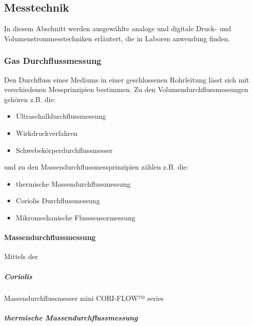 \subsection{Messtechnik}

In diesem Abschnitt werden ausgewählte analoge und digitale Druck- und Volumenstrommesstechniken erläutert, die in Laboren anwendung finden.

\subsubsection{Gas Durchflussmessung}

Den Durchfluss eines Mediums in einer geschlossenen Rohrleitung lässt sich mit verschiedenen Messprinzipien bestimmen. Zu den Volumendurchflussmessungen gehören z.B. die:

\begin{itemize}
\item Ultraschalldurchflussmessung
\item Wirkdruckverfahren
\item Schwebekörperdurchflussmesser
\end{itemize}

und zu den Massendurchflussmessprinzipien zählen z.B. die:

\begin{itemize}
\item thermische Massendurchflussmessung
\item Coriolis Durchflussmessung
\item Mikromechanische Flusssensormessung
\end{itemize}




\paragraph{Massendurchflussmessung}

Mittels der 

\subparagraph{Coriolis}

Massendurchflussmesser mini CORI-FLOW™ series

\subparagraph{thermische Massendurchflussmessung}

